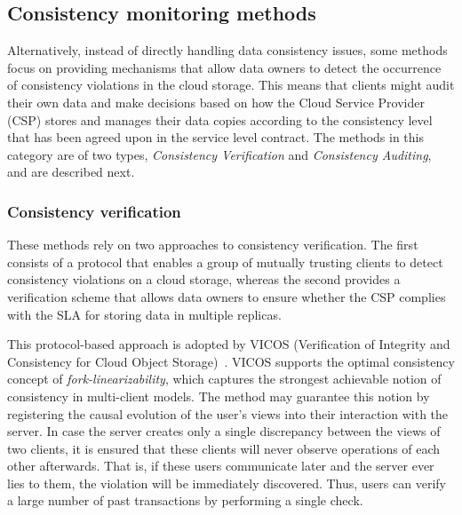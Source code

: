 \subsection{Consistency monitoring methods}

Alternatively, instead of directly handling data consistency issues, some methods focus on providing mechanisms that allow data owners to detect the occurrence of consistency violations in the cloud storage. This means that 
clients might audit their own data and make decisions based on how the Cloud Service Provider (CSP) stores and manages their data copies according to the consistency level that has been agreed upon in  the service level contract. The methods in this category are of two types, \textit{Consistency Verification} and \textit{Consistency Auditing}, and are described next.


\subsubsection{Consistency verification}

These methods rely on two approaches to consistency verification. The first consists of a protocol that enables a group of mutually trusting clients to detect consistency violations on a cloud storage, whereas the second provides a verification scheme that allows data owners to ensure whether the CSP
complies with the SLA for storing data in multiple replicas.

This protocol-based approach is adopted by VICOS (Verification of Integrity and Consistency for Cloud Object Storage)~\cite{BrandenburgerCK15}. VICOS supports the optimal con\-sist\-ency concept of \textit{fork-linearizability}, which captures the strongest achievable notion of consistency in multi-client models. The method may guarantee this notion by registering the causal evolution of the user’s views into their interaction with the server. In case the server creates only a single discrepancy between the views of two clients, it is ensured that these clients will never observe operations of each other afterwards. That is, if these users communicate later and the server ever lies to them, the violation will be immediately discovered. Thus, users can verify a large number of past transactions by performing a single check.

